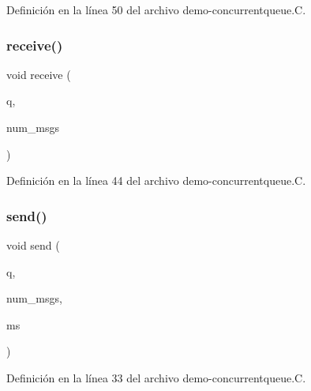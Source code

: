 Definición en la línea 50 del archivo demo-\/concurrentqueue.\+C.

\mbox{\label{demo-concurrentqueue_8_c_ab141b5e3494a69e30757648ece395552}} 
\subsubsection{\texorpdfstring{receive()}{receive()}}
{\footnotesize\ttfamily void receive (\begin{DoxyParamCaption}\item[{\hyperlink{class_designar_1_1_concurrent_queue}{Concurrent\+Queue}$<$ string $>$ \&}]{q,  }\item[{\hyperlink{namespace_designar_aa72662848b9f4815e7bf31a7cf3e33d1}{nat\+\_\+t}}]{num\+\_\+msgs }\end{DoxyParamCaption})}



Definición en la línea 44 del archivo demo-\/concurrentqueue.\+C.

\mbox{\label{demo-concurrentqueue_8_c_aa97d75998c4e7c6e867a476cb2ac4fba}} 
\subsubsection{\texorpdfstring{send()}{send()}}
{\footnotesize\ttfamily void send (\begin{DoxyParamCaption}\item[{\hyperlink{class_designar_1_1_concurrent_queue}{Concurrent\+Queue}$<$ string $>$ \&}]{q,  }\item[{\hyperlink{namespace_designar_aa72662848b9f4815e7bf31a7cf3e33d1}{nat\+\_\+t}}]{num\+\_\+msgs,  }\item[{\hyperlink{namespace_designar_aa72662848b9f4815e7bf31a7cf3e33d1}{nat\+\_\+t}}]{ms }\end{DoxyParamCaption})}



Definición en la línea 33 del archivo demo-\/concurrentqueue.\+C.

